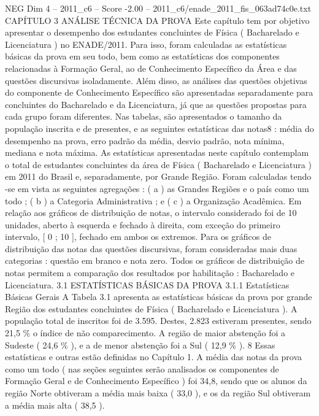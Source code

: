 \begin{textsample}{NEG Dim 4 – 2011\_c6 – Score -2.00 – 2011\_c6/enade\_2011\_fis\_063ad74c0e.txt}  \label{ex:f4_neg_060}
CAPÍTULO 3 ANÁLISE TÉCNICA DA PROVA Este capítulo tem por objetivo apresentar o desempenho dos estudantes concluintes de Física ( Bacharelado e Licenciatura ) no ENADE/2011.
Para isso, foram calculadas as estatísticas básicas da prova em seu todo, bem como as estatísticas dos componentes relacionadas à Formação Geral, ao de Conhecimento Específico da Área e das questões discursivas isoladamente.
Além disso, as análises das questões objetivas do componente de Conhecimento Específico são apresentadas separadamente para concluintes do Bacharelado e da Licenciatura, já que as questões propostas para cada grupo foram diferentes.
Nas tabelas, são apresentados o tamanho da população inscrita e de presentes, e as seguintes estatísticas das notas8 : média do desempenho na prova, erro padrão da média, desvio padrão, nota mínima, mediana e nota máxima.
As estatísticas apresentadas neste capítulo contemplam o total de estudantes concluintes da área de Física ( Bacharelado e Licenciatura ) em 2011 do Brasil e, separadamente, por Grande Região.
Foram calculadas tendo -se em vista as seguintes agregações : ( a ) as Grandes Regiões e o país como um todo ; ( b ) a Categoria Administrativa ; e ( c ) a Organização Acadêmica.
Em relação aos gráficos de distribuição de notas, o intervalo considerado foi de 10 unidades, aberto à esquerda e fechado à direita, com exceção do primeiro intervalo, [ 0 ; 10 ], fechado em ambos os extremos.
Para os gráficos de distribuição das notas das questões discursivas, foram consideradas mais duas categorias : questão em branco e nota zero.
Todos os gráficos de distribuição de notas permitem a comparação dos resultados por habilitação : Bacharelado e Licenciatura. 3.1 ESTATÍSTICAS BÁSICAS DA PROVA 3.1.1 Estatísticas Básicas Gerais A Tabela 3.1 apresenta as estatísticas básicas da prova por grande Região dos estudantes concluintes de Física ( Bacharelado e Licenciatura ).
A população total de inscritos foi de 3.595.
Destes, 2.823 estiveram presentes, sendo 21,5 \% o índice de não comparecimento.
A região de maior abstenção foi a Sudeste ( 24,6 \% ), e a de menor abstenção foi a Sul ( 12,9 \% ). 8 Essas estatísticas e outras estão definidas no Capítulo 1.
A média das notas da prova como um todo ( nas seções seguintes serão analisados os componentes de Formação Geral e de Conhecimento Específico ) foi 34,8, sendo que os alunos da região Norte obtiveram a média mais baixa ( 33,0 ), e os da região Sul obtiveram a média mais alta ( 38,5 ).

\end{textsample}
